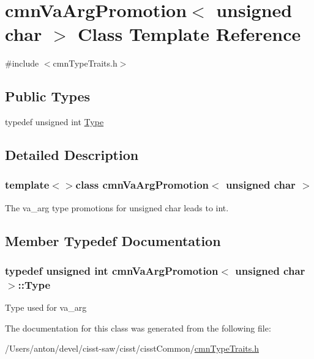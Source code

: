 \hypertarget{classcmn_va_arg_promotion_3_01unsigned_01char_01_4}{}\section{cmn\+Va\+Arg\+Promotion$<$ unsigned char $>$ Class Template Reference}
\label{classcmn_va_arg_promotion_3_01unsigned_01char_01_4}


{\ttfamily \#include $<$cmn\+Type\+Traits.\+h$>$}

\subsection*{Public Types}
\begin{DoxyCompactItemize}
\item 
typedef unsigned int \hyperlink{classcmn_va_arg_promotion_3_01unsigned_01char_01_4_a48aa7cdbc964dd0fd51f202aa5fa02bf}{Type}
\end{DoxyCompactItemize}


\subsection{Detailed Description}
\subsubsection*{template$<$$>$class cmn\+Va\+Arg\+Promotion$<$ unsigned char $>$}

The va\+\_\+arg type promotions for unsigned char leads to int. 

\subsection{Member Typedef Documentation}
\hypertarget{classcmn_va_arg_promotion_3_01unsigned_01char_01_4_a48aa7cdbc964dd0fd51f202aa5fa02bf}{}
\subsubsection[{Type}]{\setlength{\rightskip}{0pt plus 5cm}typedef unsigned int {\bf cmn\+Va\+Arg\+Promotion}$<$ unsigned char $>$\+::{\bf Type}}\label{classcmn_va_arg_promotion_3_01unsigned_01char_01_4_a48aa7cdbc964dd0fd51f202aa5fa02bf}
Type used for va\+\_\+arg 

The documentation for this class was generated from the following file\+:\begin{DoxyCompactItemize}
\item 
/\+Users/anton/devel/cisst-\/saw/cisst/cisst\+Common/\hyperlink{cmn_type_traits_8h}{cmn\+Type\+Traits.\+h}\end{DoxyCompactItemize}
